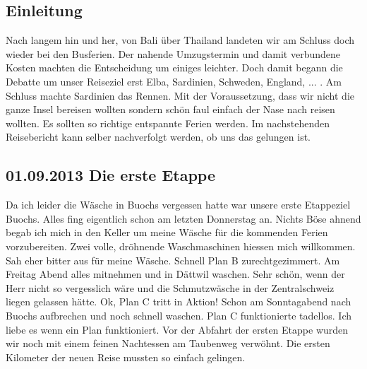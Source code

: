 


\subsection{Einleitung} 
Nach langem hin und her, von Bali über Thailand landeten wir am Schluss doch wieder bei den Busferien.
Der nahende Umzugstermin und damit verbundene Kosten machten die Entscheidung um einiges leichter.
Doch damit begann die Debatte um unser Reiseziel erst Elba, Sardinien, Schweden, England, ... .
Am Schluss machte Sardinien das Rennen.
Mit der Voraussetzung, dass wir nicht die ganze Insel bereisen wollten sondern schön faul einfach der Nase nach reisen wollten.
Es sollten so richtige entspannte Ferien werden.
Im nachstehenden Reisebericht kann selber nachverfolgt werden, ob uns das gelungen ist.  

\subsection{01.09.2013 Die erste Etappe} 
Da ich leider die Wäsche in  Buochs vergessen hatte war unsere erste Etappeziel Buochs.
Alles fing eigentlich schon am letzten Donnerstag an.
Nichts Böse ahnend begab ich mich in den Keller um meine Wäsche für die kommenden Ferien vorzubereiten.
Zwei volle, dröhnende Waschmaschinen hiessen mich willkommen.
Sah eher bitter aus für meine Wäsche.
Schnell Plan B zurechtgezimmert.
Am Freitag Abend alles mitnehmen und in Dättwil waschen.
Sehr schön, wenn der Herr nicht so vergesslich wäre und die Schmutzwäsche in der Zentralschweiz liegen gelassen hätte.
Ok, Plan C tritt in Aktion! Schon am Sonntagabend nach Buochs aufbrechen und noch schnell waschen.
Plan C funktionierte tadellos.
Ich liebe es wenn ein Plan funktioniert.
Vor der Abfahrt der ersten Etappe wurden wir noch mit einem feinen Nachtessen am Taubenweg verwöhnt.
Die ersten Kilometer der neuen Reise mussten so einfach gelingen.

